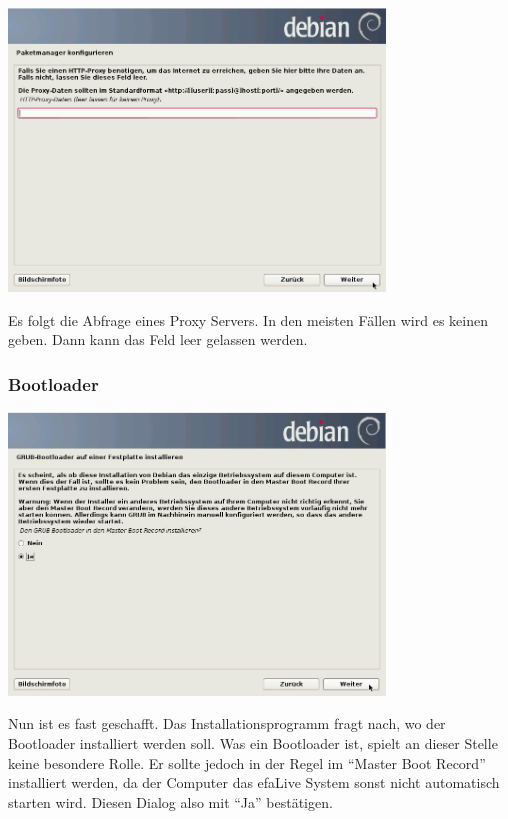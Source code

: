 \documentclass[a4paper,12pt,twoside]{article}
\begin{document}
\begin{minipage}{\linewidth}
    \centering
    \includegraphics[width=10cm]{efaLivede-img/efaLivede-img16.png}
    \label{fig:auswahl_proxy}
\end{minipage}
\bigskip

Es folgt die Abfrage eines Proxy Servers. In den meisten Fällen wird es
keinen geben. Dann kann das Feld leer gelassen werden.


\subsubsection{Bootloader}
\label{sct:bootloader}

\begin{minipage}{\linewidth}
    \centering
    \includegraphics[width=10cm]{efaLivede-img/efaLivede-img17.png}
    \label{fig:inst_grub}
\end{minipage}
\bigskip

Nun ist es fast geschafft. Das Installationsprogramm fragt nach, wo der
Bootloader installiert werden soll. Was ein Bootloader ist, spielt an
dieser Stelle keine besondere Rolle. Er sollte jedoch in der Regel im
"`Master Boot Record"' installiert werden, da
der Computer das efaLive System sonst nicht automatisch starten wird.
Diesen Dialog also mit "`Ja"' bestätigen.
\end{document}
